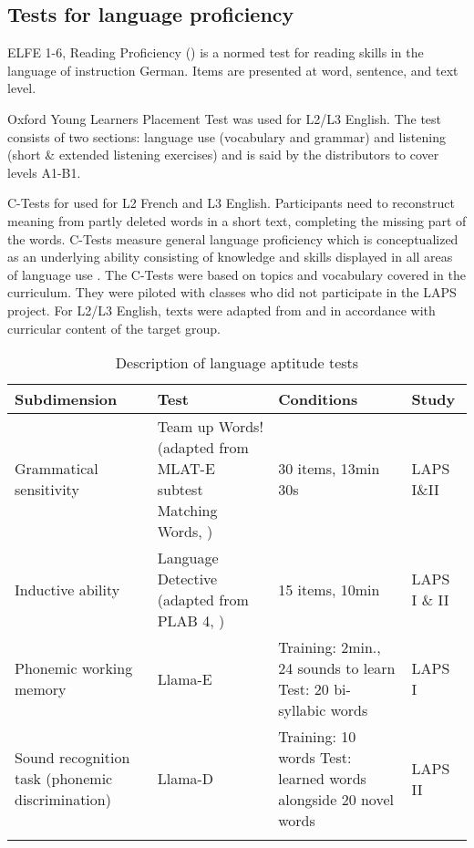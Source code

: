 \documentclass[output=paper]{langsci/langscibook}
\begin{document}
\subsection{Tests for language proficiency}
ELFE 1-6, Reading Proficiency (\citealt{LenhardSchneider2006}) is a normed test for reading skills in the language of instruction German. Items are presented at word, sentence, and text level.

Oxford Young Learners Placement Test \citep{Testing2013} was used for L2/L3 English. The test consists of two sections: language use (vocabulary and grammar) and listening (short \& extended listening exercises) and is said by the distributors to cover levels A1-B1.

C-Tests for used for L2 French and L3 English. Participants need to reconstruct meaning from partly deleted words in a short text, completing the missing part of the words. C-Tests measure general language proficiency which is conceptualized as an underlying ability consisting of knowledge and skills displayed in all areas of language use \citep{EckesGrotjahn2006}. The C-Tests were based on topics and vocabulary covered in the curriculum. They were piloted with classes who did not participate in the LAPS project. For L2/L3 English, texts were adapted from \citet{BabaiiShahri2010} and \citet{WildenPorsch2017} in accordance with curricular content of the target group.

\begin{table}[p]\footnotesize
\begin{tabularx}{\textwidth}{QQQl}
\lsptoprule
{Subdimension} & {Test} & {Conditions} & {Study}\\\midrule
Grammatical sensitivity & Team up Words! (adapted from MLAT-E subtest Matching Words, \citealt{CarrollSapon2010}) & 30 items, 13min 30s & LAPS I\&II\\
Inductive ability & Language Detective (adapted from PLAB 4, \citealt{PimsleurEtAl2004}) & 15 items, 10min & LAPS I \& II\\
Phonemic working memory & Llama-E \citep{MearaEtAl2001} & Training: 2min., 24 sounds to learn Test: 20 bi-syllabic words & LAPS I\\
Sound recognition task (phonemic discrimination) & Llama-D \citep{MearaEtAl2001} & Training: 10 words Test: learned words alongside 20 novel words & LAPS II\\
\lspbottomrule
\end{tabularx}
\caption{Description of language aptitude tests\label{tab:tests:part-1}}
\end{table}
\end{document}
